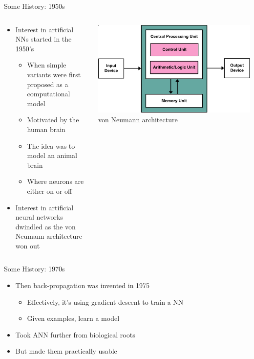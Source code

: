 \documentclass[aspectratio=169]{beamer}
\begin{document}
\begin{frame}{Some History: 1950s}

\begin{columns}
\begin{column}{0.6\textwidth}
\begin{itemize}
	\item Interest in artificial NNs started in the 1950's
	\begin{itemize}
		\item When simple variants were first proposed as a computational model
		\item Motivated by the human brain
		\item The idea was to model an animal brain
		\item Where neurons are either on or off
	\end{itemize}
	\item Interest in artificial neural networks dwindled as the von Neumann architecture won out
\end{itemize}
\end{column}
\begin{column}{0.4\textwidth}
\begin{centering}
\includegraphics[width=1\textwidth]{lectFF/vna.pdf}\\
von Neumann architecture
\end{centering}
\end{column}
\end{columns}
\end{frame}
\begin{frame}{Some History: 1970s}

\begin{itemize}
	\item Then back-propagation was invented in 1975
	\begin{itemize}
		\item Effectively, it's using gradient descent to train a NN
		\item Given examples, learn a model
	\end{itemize}
	\item Took ANN further from biological roots
	\item But made them practically usable
	
\end{itemize}
\end{frame}
\end{document}
